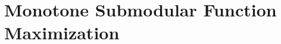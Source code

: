 \newcommand{\defpath}[1]{\def\path{content/#1}}
\newcommand{\add}[1]{}





\chapter{Monotone Submodular Function Maximization}
\label{chapter:monotone-submodular-function-maximization}
\defpath{knapsack}
\add{knapsack}

